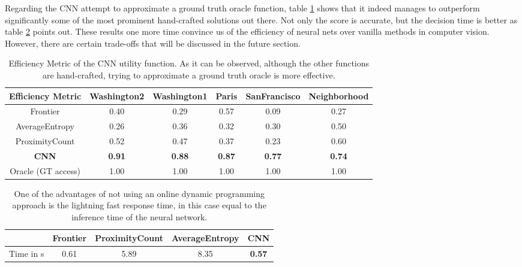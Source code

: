 \documentclass[a4paper,11pt,english]{article}
\begin{document}
Regarding the CNN attempt to approximate a ground truth oracle function, table \ref{tab:hepptable1} shows that it indeed manages to outperform significantly some of the most prominent hand-crafted solutions out there. Not only the score is accurate, but the decision time is better as table \ref{tab:hepptable2} points out. These results one more time convince us of the efficiency of neural nets over vanilla methods in computer vision. However, there are certain trade-offs that will be discussed in the future section.
\begin{table}[H]
\begin{adjustbox}{width=\columnwidth,center}
\begin{tabular}{ |c|c|c|c|c|c| } 
\hline 
 Efficiency Metric & Washington2 & Washington1 & Paris & SanFrancisco & Neighborhood\\
 \hline
 Frontier & 0.40 & 0.29 & 0.57 & 0.09 & 0.27 \\ 
 AverageEntropy \cite{isler2016information}& 0.26 & 0.36 & 0.32 & 0.30 & 0.50 \\ 
 ProximityCount \cite{isler2016information}& 0.52 & 0.47 & 0.37 & 0.23 & 0.60 \\ 
 \textbf{CNN \cite{hepp2018learn}} & \textbf{0.91} & \textbf{0.88} & \textbf{0.87} & \textbf{0.77} & \textbf{0.74} \\
 Oracle (GT access) & 1.00 & 1.00 & 1.00 & 1.00 & 1.00 \\
 \hline
\end{tabular}
\end{adjustbox}
\caption{\label{tab:hepptable1} Efficiency Metric of the CNN utility function. As it can be observed, although the other functions are hand-crafted, trying to approximate a ground truth oracle is more effective.}
\end{table}

\begin{table}[H]
\begin{adjustbox}{width=\columnwidth,center}
\begin{tabular}{ |c|c|c|c|c| } 
\hline
& Frontier & ProximityCount & AverageEntropy & CNN \cite{hepp2018learn}\\
\hline
Time in s & 0.61 & 5.89 & 8.35 & \textbf{0.57}\\
\hline
\end{tabular}
\end{adjustbox}
\caption{\label{tab:hepptable2} One of the advantages of not using an online dynamic programming approach is the lightning fast response time, in this case equal to the inference time of the neural network.}
\end{table}
\end{document}
